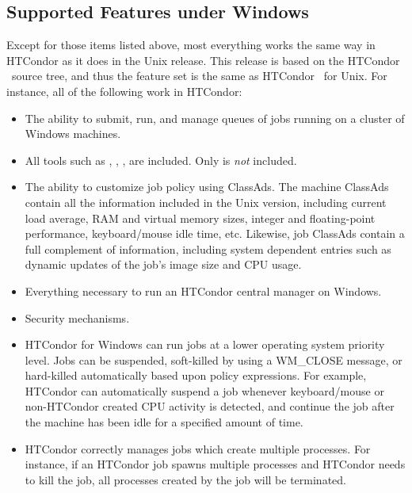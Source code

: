 \subsection{Supported Features under Windows}

Except for those items listed above, most everything works
the same way in HTCondor as it does in the Unix release.
This release is based on the HTCondor \VersionNotice\ source tree, and thus the
feature set is the same as HTCondor \VersionNotice\ for Unix.  
For instance, all of the following work in HTCondor:
\begin{itemize}

\item The ability to submit, run, and manage queues of jobs running on a
cluster of Windows machines.

\item All tools such as , , ,
are included. Only  is
\emph{not} included.

\item The ability to customize job policy using ClassAds.
The machine ClassAds contain all the information included in the Unix version,
including current load average, RAM and virtual memory sizes, integer and
floating-point performance, keyboard/mouse idle time, etc.  Likewise, job
ClassAds contain a full complement of information, including system
dependent entries such as dynamic updates of the job's image size and CPU
usage.

\item Everything necessary to run an HTCondor central manager on Windows.

\item Security mechanisms.

\item HTCondor for Windows can run jobs at a lower operating system
priority level.
Jobs can be suspended, soft-killed by using a WM\_CLOSE message,
or hard-killed automatically based upon policy expressions.
For example, HTCondor can automatically suspend a job
whenever keyboard/mouse or non-HTCondor created CPU activity is detected, and
continue the job after the machine has been idle for a specified amount
of time.

\item HTCondor correctly manages jobs which create multiple processes.  For
instance, if an HTCondor job spawns multiple processes and HTCondor
needs to kill the job,
all processes created by the job will be terminated.


\end{itemize}
